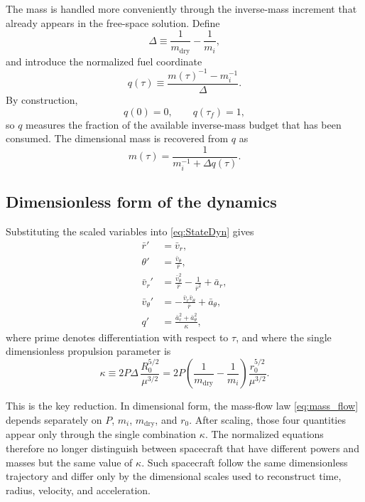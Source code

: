 \documentclass[journal, a4paper]{IEEEtran}
\begin{document}
The mass is handled more conveniently through the inverse-mass increment that already appears in the free-space solution. 
Define
\begin{equation}
  \Delta \equiv \frac{1}{m_\mathrm{dry}}-\frac{1}{m_i},
\end{equation}
and introduce the normalized fuel coordinate
\begin{equation}
  q(\tau) \equiv \frac{m(\tau)^{-1}-m_i^{-1}}{\Delta}.
  \label{eq:q_def_similarity}
\end{equation}
By construction,
\begin{equation}
  q(0)=0,
  \qquad
  q(\tau_f)=1,
\end{equation}
so \(q\) measures the fraction of the available inverse-mass budget that has been consumed. 
The dimensional mass is recovered from \(q\) as
\begin{equation}
  m(\tau)=\frac{1}{m_i^{-1}+\Delta q(\tau)}.
  \label{eq:m_from_q_similarity}
\end{equation}

\subsection{Dimensionless form of the dynamics}
Substituting the scaled variables into \eqref{eq:StateDyn} gives
\begin{subequations}\label{eq:StateDyn_scaled}
\begin{align}
  \bar r' &= \bar v_r, \\
  \theta' &= \frac{\bar v_\theta}{\bar r}, \\
  \bar v_r' &= \frac{\bar v_\theta^2}{\bar r} - \frac{1}{\bar r^2} + \bar a_r, \\
  \bar v_\theta' &= -\frac{\bar v_r\bar v_\theta}{\bar r} + \bar a_\theta, \\
  q' &= \frac{\bar a_r^2+\bar a_\theta^2}{\kappa},
\end{align}
\end{subequations}
where prime denotes differentiation with respect to \(\tau\), and where the single dimensionless propulsion parameter is
\begin{equation}
  \kappa \equiv 2P\Delta\,\frac{R_0^{5/2}}{\mu^{3/2}}
  = 2P\left(\frac{1}{m_\mathrm{dry}}-\frac{1}{m_i}\right)\frac{r_0^{5/2}}{\mu^{3/2}}.
  \label{eq:kappa_def}
\end{equation}

This is the key reduction. 
In dimensional form, the mass-flow law \eqref{eq:mass_flow} depends separately on \(P\), \(m_i\), \(m_\mathrm{dry}\), and \(r_0\). 
After scaling, those four quantities appear only through the single combination \(\kappa\). 
The normalized equations therefore no longer distinguish between spacecraft that have different powers and masses but the same value of \(\kappa\). 
Such spacecraft follow the same dimensionless trajectory and differ only by the dimensional scales used to reconstruct time, radius, velocity, and acceleration.
\end{document}
